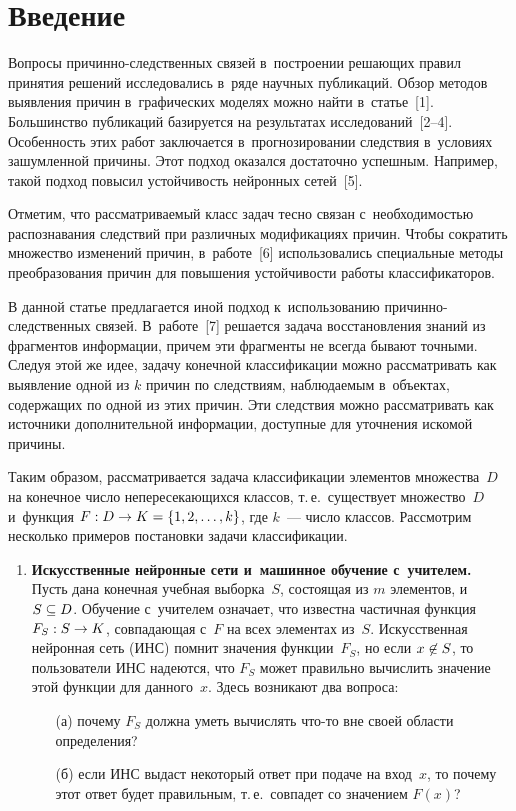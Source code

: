 \begin{multicols}{2}

\label{st\stat}
  
  \section{Введение }
  
  Вопросы причинно-следственных связей в~построении решающих правил 
принятия решений исследовались в~ряде научных публикаций. Обзор методов 
выявления причин в~графических моделях можно найти в~статье~[1]. 
Большинство публикаций базируется на результатах исследований~[2--4]. 
Особенность этих работ заключается в~прогнозировании следствия в~условиях 
зашумленной причины. Этот подход оказался достаточно успешным. Например, 
такой подход повысил устойчивость нейронных сетей~[5]. 
  
  Отметим, что рассматриваемый класс задач тесно связан с~необходимостью 
распознавания следствий при различных модификациях причин. Чтобы сократить 
множество изменений причин, \mbox{в~работе}~[6] использовались специальные методы 
преобразования причин для повышения устойчивости работы классификаторов. 
  
  В данной статье предлагается иной подход к~использованию  
при\-чин\-но-след\-ст\-вен\-ных связей. В~работе~[7] решается задача 
восстановления знаний из фрагментов информации, причем эти фрагменты не 
всегда бывают точными. Следуя этой же идее, задачу конечной классификации 
можно рассматривать как выявление одной из $k$ причин по следствиям, 
наблюдаемым в~объектах, содержащих по одной из этих причин. Эти следствия 
можно рассматривать как источники дополнительной информации, доступные 
для уточнения искомой причины. 
  
  Таким образом, рассматривается задача классификации элементов 
множества~$D$ на конечное чис\-ло непересекающихся классов, т.\,е.\ 
существует множество~$D$ и~функция $F: D\hm\to K\hm= \{1,2,\ldots , k\}$, где 
$k$~--- чис\-ло классов. Рас\-смот\-рим несколько примеров постановки задачи 
классификации.
  \begin{enumerate}[1.]
\item \textbf{Искусственные нейронные сети и~машинное обуче\-ние 
с~учителем.} Пусть дана конечная учебная выборка~$S$, состоящая из $m$ 
элементов, и~$S\hm\subseteq D$. Обучение с~учителем означает, что известна 
частичная функция $F_S: S\hm\to K$, совпадающая с~$F$ на всех элементах 
из~$S$. Искусственная нейронная сеть (ИНС) помнит значения функции~$F_S$, но если $x\hm\not\in S$, то 
пользователи ИНС надеются, что $F_S$ может правильно вычислить значение 
этой функции для данного~$x$. Здесь возникают два вопроса:
\begin{itemize}
\item[(а)] почему $F_S$ должна уметь вычислять что-то вне своей об\-ласти 
определения?
\item[(б)] если ИНС выдаст некоторый ответ при подаче на вход~$x$, то почему 
этот ответ будет правильным, т.\,е.\ совпадет со значением $F(x)$?
\end{itemize}
  

\end{enumerate}
\end{multicols}
